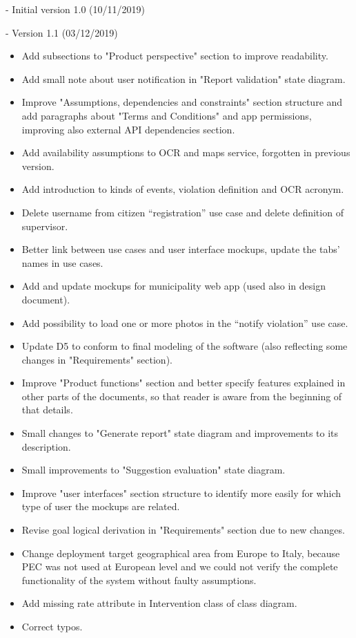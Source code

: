 - Initial version 1.0 (10/11/2019)

- Version 1.1 (03/12/2019)
\begin{itemize}
	\item Add subsections to "Product perspective" section to improve readability.
	\item Add small note about user notification in "Report validation" state diagram. 
	\item Improve "Assumptions, dependencies and constraints" section structure and add paragraphs about "Terms and Conditions" and app permissions, improving also external API dependencies section.
	\item Add availability assumptions to OCR and maps service, forgotten in previous version.
	\item Add introduction to kinds of events, violation definition and OCR acronym.
	\item Delete username from citizen “registration” use case and delete definition of supervisor.
	\item Better link between use cases and user interface mockups, update the tabs’ names in use cases.
	\item Add and update mockups for municipality web app (used also in design document).
	\item Add possibility to load one or more photos in the “notify violation” use case.
	\item Update D5 to conform to final modeling of the software (also reflecting some changes in "Requirements" section).
	\item Improve "Product functions" section and better specify features explained in other parts of the documents, so that reader is aware from the beginning of that details.
	\item Small changes to "Generate report" state diagram and improvements to its description.
	\item Small improvements to "Suggestion evaluation" state diagram.
	\item Improve "user interfaces" section structure to identify more easily for which type of user the mockups are related.
	\item Revise goal logical derivation in "Requirements" section due to new changes.
	\item Change deployment target geographical area from Europe to Italy, because PEC was not used at European level and we could not verify the complete functionality of the system without faulty assumptions.  
	\item Add missing rate attribute in Intervention class of class diagram.
	\item Correct typos.
\end{itemize}